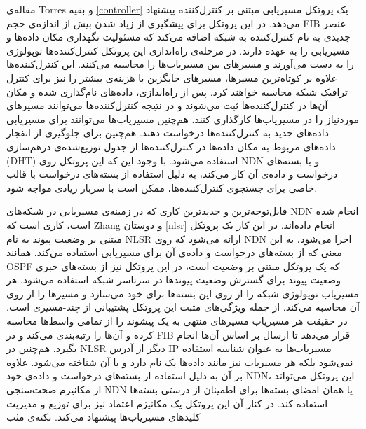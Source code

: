 مقاله‌ی Torres و بقیه \ref{controller} یک پروتکل مسیریابی مبتنی بر کنترل‌کننده پیشنهاد می‌دهد. در این پروتکل برای پیشگیری از زیاد شدن بیش از اندازه‌ی حجم FIB عنصر جدیدی به نام کنترل‌کننده به شبکه اضافه می‌کند که مسئولیت نگهداری مکان داده‌ها و مسیریابی را به عهده دارند. در مرحله‌ی راه‌اندازی این پروتکل کنترل‌کننده‌ها توپولوژی را به دست می‌آورند و مسیرهای بین مسیریاب‌ها را محاسبه می‌کنند. این کنترل‌کننده‌ها علاوه بر کوتاه‌ترین مسیرها، مسیر‌های جایگزین با هزینه‌ی بیشتر را نیز برای کنترل ترافیک شبکه محاسبه خواهند کرد. پس از راه‌اندازی، داده‌های نام‌گذاری شده و مکان آن‌ها در کنترل‌کننده‌ها ثبت می‌شوند و در نتیجه کنترل‌کننده‌ها می‌توانند مسیرهای موردنیاز را در مسیریاب‌ها کارگذاری کنند. هم‌چنین مسیریاب‌ها می‌توانند برای مسیریابی داده‌های جدید به کنترل‌کننده‌ها درخواست دهند. هم‌چنین برای جلوگیری از انفجار داده‌های مربوط به مکان داده‌ها در کنترل‌کننده‌ها از جدول توزیع‌شده‌ی درهم‌سازی  (DHT) استفاده می‌شود. با وجود این که این پروتکل روی NDN و با بسته‌های درخواست و داده‌ی آن کار می‌کند، به دلیل استفاده از بسته‌های درخواست با قالب خاصی برای جستجوی کنترل‌کننده‌ها، ممکن است با سربار زیادی مواجه شود. 

قابل‌توجه‌ترین و جدیدترین کاری که در زمینه‌ی مسیریابی در شبکه‌های NDN انجام شده است، کاری است که Zhang و دوستان \ref{nlsr} انجام داده‌اند. در این کار یک پروتکل مبتنی بر وضعیت پیوند به نام NLSR ارائه می‌شود که روی NDN اجرا می‌شود، به این معنی که از بسته‌های درخواست و داده‌ی آن برای مسیریابی استفاده می‌کند. همانند OSPF که یک پروتکل مبتنی بر وضعیت است، در این پروتکل نیز از بسته‌های خبری وضعیت پیوند برای گسترش وضعیت پیوندها در سرتاسر شبکه استفاده می‌‌شود. هر مسیریاب توپولوژی شبکه را از روی این بسته‌ها برای خود می‌سازد و مسیرها را از روی آن محاسبه می‌کند. از جمله ویژگی‌های مثبت این پروتکل پشتیبانی از چند-مسیری است. در حقیقت هر مسیریاب مسیرهای منتهی به یک پیشوند را از تمامی واسط‌ها محاسبه کرده و آن‌ها را رتبه‌بندی می‌کند و در FIB قرار می‌دهد تا ارسال بر اساس آن‌ها انجام بگیرد. هم‌چنین در NLSR دیگر از آدرس IP مسیریاب‌ها به عنوان شناسه استفاده نمی‌شود بلکه هر مسیریاب نیز مانند داده‌ها یک نام دارد و با آن شناخته می‌شود. علاوه بر آن به دلیل استفاده از بسته‌های درخواست و داده‌ی خود NDN، این پروتکل می‌تواند از مکانیزم صحت‌سنجی NDN یا همان امضای بسته‌ها برای اطمینان از درستی بسته‌ها استفاده کند. در کنار آن این پروتکل یک مکانیزم اعتماد نیز برای توزیع و مدیریت کلید‌های مسیریاب‌ها پیشنهاد می‌کند. نکته‌ی مثب

